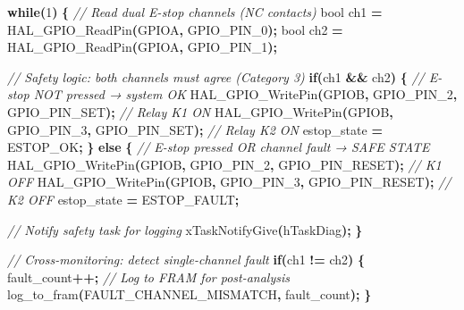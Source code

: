 \documentclass[
]{article}
\newenvironment{Shaded}{\begin{snugshade}}{\end{snugshade}}
\newcommand{\CommentTok}[1]{\textcolor[rgb]{0.56,0.35,0.01}{\textit{#1}}}
\newcommand{\ControlFlowTok}[1]{\textcolor[rgb]{0.13,0.29,0.53}{\textbf{#1}}}
\newcommand{\DataTypeTok}[1]{\textcolor[rgb]{0.13,0.29,0.53}{#1}}
\newcommand{\DecValTok}[1]{\textcolor[rgb]{0.00,0.00,0.81}{#1}}
\newcommand{\NormalTok}[1]{#1}
\newcommand{\OperatorTok}[1]{\textcolor[rgb]{0.81,0.36,0.00}{\textbf{#1}}}
\begin{document}
\begin{Shaded}
\begin{Highlighting}[]
    \ControlFlowTok{while}\OperatorTok{(}\DecValTok{1}\OperatorTok{)} \OperatorTok{\{}
        \CommentTok{// Read dual E{-}stop channels (NC contacts)}
        \DataTypeTok{bool}\NormalTok{ ch1 }\OperatorTok{=}\NormalTok{ HAL\_GPIO\_ReadPin}\OperatorTok{(}\NormalTok{GPIOA}\OperatorTok{,}\NormalTok{ GPIO\_PIN\_0}\OperatorTok{);}
        \DataTypeTok{bool}\NormalTok{ ch2 }\OperatorTok{=}\NormalTok{ HAL\_GPIO\_ReadPin}\OperatorTok{(}\NormalTok{GPIOA}\OperatorTok{,}\NormalTok{ GPIO\_PIN\_1}\OperatorTok{);}

        \CommentTok{// Safety logic: both channels must agree (Category 3)}
        \ControlFlowTok{if}\OperatorTok{(}\NormalTok{ch1 }\OperatorTok{\&\&}\NormalTok{ ch2}\OperatorTok{)} \OperatorTok{\{}
            \CommentTok{// E{-}stop NOT pressed → system OK}
\NormalTok{            HAL\_GPIO\_WritePin}\OperatorTok{(}\NormalTok{GPIOB}\OperatorTok{,}\NormalTok{ GPIO\_PIN\_2}\OperatorTok{,}\NormalTok{ GPIO\_PIN\_SET}\OperatorTok{);}   \CommentTok{// Relay K1 ON}
\NormalTok{            HAL\_GPIO\_WritePin}\OperatorTok{(}\NormalTok{GPIOB}\OperatorTok{,}\NormalTok{ GPIO\_PIN\_3}\OperatorTok{,}\NormalTok{ GPIO\_PIN\_SET}\OperatorTok{);}   \CommentTok{// Relay K2 ON}
\NormalTok{            estop\_state }\OperatorTok{=}\NormalTok{ ESTOP\_OK}\OperatorTok{;}
        \OperatorTok{\}} \ControlFlowTok{else} \OperatorTok{\{}
            \CommentTok{// E{-}stop pressed OR channel fault → SAFE STATE}
\NormalTok{            HAL\_GPIO\_WritePin}\OperatorTok{(}\NormalTok{GPIOB}\OperatorTok{,}\NormalTok{ GPIO\_PIN\_2}\OperatorTok{,}\NormalTok{ GPIO\_PIN\_RESET}\OperatorTok{);} \CommentTok{// K1 OFF}
\NormalTok{            HAL\_GPIO\_WritePin}\OperatorTok{(}\NormalTok{GPIOB}\OperatorTok{,}\NormalTok{ GPIO\_PIN\_3}\OperatorTok{,}\NormalTok{ GPIO\_PIN\_RESET}\OperatorTok{);} \CommentTok{// K2 OFF}
\NormalTok{            estop\_state }\OperatorTok{=}\NormalTok{ ESTOP\_FAULT}\OperatorTok{;}

            \CommentTok{// Notify safety task for logging}
\NormalTok{            xTaskNotifyGive}\OperatorTok{(}\NormalTok{hTaskDiag}\OperatorTok{);}
        \OperatorTok{\}}

        \CommentTok{// Cross{-}monitoring: detect single{-}channel fault}
        \ControlFlowTok{if}\OperatorTok{(}\NormalTok{ch1 }\OperatorTok{!=}\NormalTok{ ch2}\OperatorTok{)} \OperatorTok{\{}
\NormalTok{            fault\_count}\OperatorTok{++;}
            \CommentTok{// Log to FRAM for post{-}analysis}
\NormalTok{            log\_to\_fram}\OperatorTok{(}\NormalTok{FAULT\_CHANNEL\_MISMATCH}\OperatorTok{,}\NormalTok{ fault\_count}\OperatorTok{);}
        \OperatorTok{\}}


\end{Highlighting}
\end{Shaded}
\end{document}
